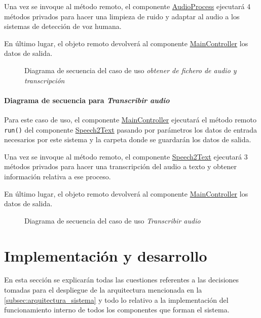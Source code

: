 \documentclass[../main.tex]{subfiles}
\begin{document}
Una vez se invoque al método remoto, el componente \hyperref[par:audioprocess]{AudioProcess} ejecutará 4 métodos privados para hacer una limpieza de ruido y adaptar al audio a los sistemas de detección de voz humana.

En último lugar, el objeto remoto devolverá al componente \hyperref[par:maincontroller]{MainController} los datos de salida.

\begin{figure}[H]
    \centering
    
    \caption{Diagrama de secuencia del caso de uso \textit{obtener de fichero de audio y transcripción}}
    \label{fig:flow_audioprocess}
\end{figure}

\paragraph{Diagrama de secuencia para \textit{Transcribir audio}}

Para este caso de uso, el componente \hyperref[par:maincontroller]{MainController} ejecutará el método remoto \verb+run()+ del componente  \hyperref[par:speech2text]{Speech2Text} pasando por parámetros los datos de entrada necesarios por este sistema y la carpeta donde se guardarán los datos de salida.

Una vez se invoque al método remoto, el componente \hyperref[par:speech2text]{Speech2Text} ejecutará 3 métodos privados para hacer una transcripción del audio a texto y obtener información relativa a ese proceso.

En último lugar, el objeto remoto devolverá al componente \hyperref[par:maincontroller]{MainController} los datos de salida.

\begin{figure}[H]
    \centering
    
    \caption{Diagrama de secuencia del caso de uso \textit{Transcribir audio}}
    \label{fig:flow_spech2text}
\end{figure}


\section{Implementación y desarrollo}\label{sec:implementacion}

En esta sección se explicarán todas las cuestiones referentes a las decisiones tomadas para el despliegue de la arquitectura mencionada en la \autoref{subsec:arquitectura_sistema} y todo lo relativo a la implementación del funcionamiento interno de todos los componentes que forman el sistema.
\end{document}
